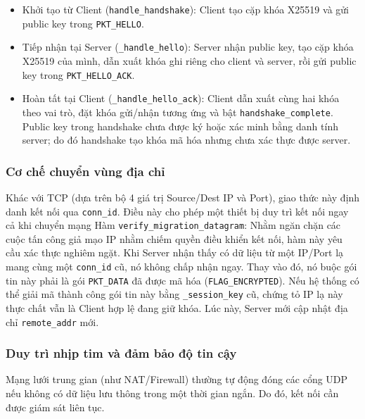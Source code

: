 \begin{itemize}
    \item Khởi tạo từ Client (\texttt{handle\_handshake}): Client tạo cặp khóa X25519 và gửi public key trong \texttt{PKT\_HELLO}.
    \item Tiếp nhận tại Server (\texttt{\_handle\_hello}): Server nhận public key, tạo cặp khóa X25519 của mình, dẫn xuất khóa ghi riêng cho client và server, rồi gửi public key trong \texttt{PKT\_HELLO\_ACK}.
    \item Hoàn tất tại Client (\texttt{\_handle\_hello\_ack}): Client dẫn xuất cùng hai khóa theo vai trò, đặt khóa gửi/nhận tương ứng và bật \texttt{handshake\_complete}. Public key trong handshake chưa được ký hoặc xác minh bằng danh tính server; do đó handshake tạo khóa mã hóa nhưng chưa xác thực được server.
\end{itemize}

\subsubsection{Cơ chế chuyển vùng địa chỉ}
Khác với TCP (dựa trên bộ 4 giá trị Source/Dest IP và Port), giao thức này định danh kết nối qua \texttt{conn\_id}. Điều này cho phép một thiết bị duy trì kết nối ngay cả khi chuyển mạng 
Hàm \texttt{verify\_migration\_datagram}: Nhằm ngăn chặn các cuộc tấn công giả mạo IP nhằm chiếm quyền điều khiển kết nối, hàm này yêu cầu xác thực nghiêm ngặt. Khi Server nhận thấy có dữ liệu từ một IP/Port lạ mang cùng một \texttt{conn\_id} cũ, nó không chấp nhận ngay. Thay vào đó, nó buộc gói tin này phải là gói \texttt{PKT\_DATA} đã được mã hóa (\texttt{FLAG\_ENCRYPTED}). Nếu hệ thống có thể giải mã thành công gói tin này bằng \texttt{\_session\_key} cũ, chứng tỏ IP lạ này thực chất vẫn là Client hợp lệ đang giữ khóa. Lúc này, Server mới cập nhật địa chỉ \texttt{remote\_addr} mới.


\subsubsection{Duy trì nhịp tim và đảm bảo độ tin cậy}
Mạng lưới trung gian (như NAT/Firewall) thường tự động đóng các cổng UDP nếu không có dữ liệu lưu thông trong một thời gian ngắn. Do đó, kết nối cần được giám sát liên tục.

